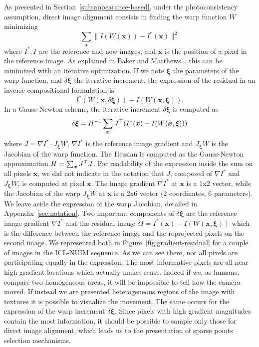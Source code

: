 As presented in Section~\ref{sub:appearance-based},
under the photoconsistency assumption, direct image alignment consists
in finding the warp function $W$ minimizing
\[
	\sum_{\bm{x}}\|I(W(\bm{x})) - I^{*}(\bm{x})\|^2
\]
where $I^{*}, I$ are the reference and new images,
and $\bm{x}$ is the position of a pixel in the reference image.
As explained in Baker and Matthews~\cite{baker2004lucas},
this can be minimized with an iterative optimization.
If we note $\bm{\xi}$ the parameters of the warp function,
and $\delta\bm{\xi}$ the iterative increment,
the expression of the residual in an inverse compositional formulation is
\[
	I^{*}(W(\bm{x}, \delta \bm{\xi})) - I(W(\bm{x}, \bm{\xi})).
\]
In a Gauss-Newton scheme, the iterative increment $\delta\bm{\xi}$ is computed as
\[
	\delta \bm{\xi} = H^{-1} \sum_{\bm{x}} J^{\top} (I^{*}(\bm{x}) - I(W(\bm{x}, \bm{\xi})))
\]
where $J = \nabla I^{*} \cdot J_{\bm{\xi}}W$, $\nabla I^{*}$ is the reference image gradient
and $J_{\bm{\xi}}W$ is the Jacobian of the warp function.
The Hessian is computed as the Gauss-Newton approximation
$H = \sum_{\bm{x}}J^{\top}J$.
For readability of the expression inside the sum on all pixels $\bm{x}$,
we did not indicate in the notation that $J$,
composed of $\nabla I^{*}$ and  $J_{\bm{\xi}}W$, is computed at pixel $\bm{x}$.
The image gradient $\nabla I^{*}$ at $\bm{x}$ is a 1x2 vector,
while the Jacobian of the warp $J_{\bm{\xi}}W$ at $\bm{x}$ is a 2x6 vector (2 coordinates, 6 parameters).
We leave aside the expression of the warp Jacobian, detailed in Appendix~\ref{sec:notation}.
Two important components of $\delta \bm{\xi}$
are the reference image gradient $\nabla I^{*}$
and the residual image $\delta I = I^{*}(\bm{x}) - I(W(\bm{x}, \bm{\xi}))$
which is the difference between the reference image and
the reprojected pixels on the second image.
We represented both in Figure~\ref{fig:gradient-residual}
for a couple of images in the ICL-NUIM sequence.
As we can see there, not all pixels are participating equally in the expression.
The most informative pixels are all near high gradient locations which actually makes sense.
Indeed if we, as humans, compare two homogeneous areas,
it will be impossible to tell how the camera moved.
If instead we are presented heterogeneous regions of the image with textures
it is possible to visualize the movement.
The same occurs for the expression of the warp increment $\delta \bm{\xi}$.
Since pixels with high gradient magnitudes contain the most information,
it should be possible to sample only those for direct image alignment,
which leads us to the presentation of sparse points selection mechanisms.

